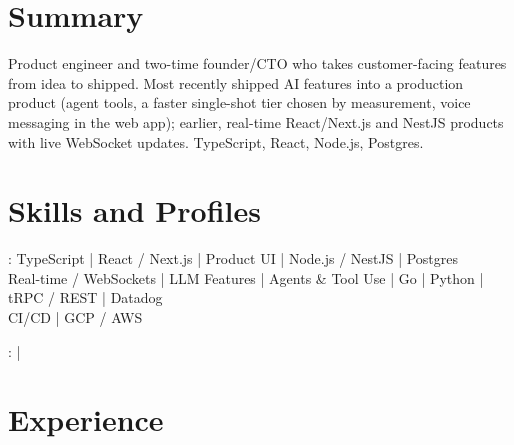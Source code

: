 \documentclass[print]{jack-resume}
\begin{document}
\pagecolor{darkmodeBackground}


\begin{minipage}[t][1cm][t]{.03\textwidth}
    \hfill
\end{minipage}

\section{Summary}
Product engineer and two-time founder/CTO who takes customer-facing features from idea to shipped. Most recently shipped AI features into a production product (agent tools, a faster single-shot tier chosen by measurement, voice messaging in the web app); earlier, real-time React/Next.js and NestJS products with live WebSocket updates. TypeScript, React, Node.js, Postgres.
\sectionsep

\section{Skills and Profiles}
:
TypeScript \hfill | \hfill
React / Next.js \hfill | \hfill
Product UI \hfill | \hfill
Node.js / NestJS \hfill | \hfill
Postgres \\
\hspace{1.0cm} Real-time / WebSockets \hfill | \hfill
LLM Features \hfill | \hfill
Agents \& Tool Use \hfill | \hfill
Go \hfill | \hfill
Python \hfill | \hfill
tRPC / REST \hfill | \hfill
Datadog \\
\hspace{1.0cm} CI/CD \hfill | \hfill
GCP / AWS \\

\raggedright{
    :
      \href{https://www.linkedin.com/in/jack-sturtevant/}{ \ExternalLink} |
     \href{https://github.com/jacksturt}{ \ExternalLink}}

\section{Experience}
\end{document}
